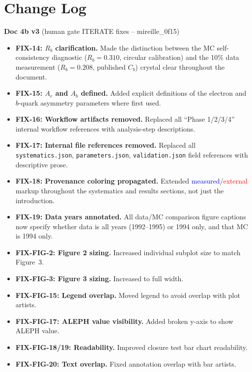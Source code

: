 \documentclass[11pt,a4paper]{article}
\newcommand{\measured}[1]{\textcolor{blue}{#1}}
\newcommand{\external}[1]{\textcolor{red}{#1}}
\begin{document}
\tableofcontents
\clearpage

\section*{Change Log}

\textbf{Doc 4b v3} (human gate ITERATE fixes -- mireille\_0f15)
\begin{itemize}
\item \textbf{FIX-14: $R_b$ clarification.} Made the distinction between the MC self-consistency
  diagnostic ($R_b = 0.310$, circular calibration) and the 10\% data measurement
  ($R_b = 0.208$, published $C_b$) crystal clear throughout the document.
\item \textbf{FIX-15: $A_e$ and $A_b$ defined.} Added explicit definitions of the
  electron and $b$-quark asymmetry parameters where first used.
\item \textbf{FIX-16: Workflow artifacts removed.} Replaced all ``Phase 1/2/3/4''
  internal workflow references with analysis-step descriptions.
\item \textbf{FIX-17: Internal file references removed.} Replaced all
  \texttt{systematics.json}, \texttt{parameters.json}, \texttt{validation.json}
  field references with descriptive prose.
\item \textbf{FIX-18: Provenance coloring propagated.} Extended
  \measured{measured}/\external{external} markup throughout the systematics and
  results sections, not just the introduction.
\item \textbf{FIX-19: Data years annotated.} All data/MC comparison figure captions
  now specify whether data is all years (1992--1995) or 1994 only, and that MC is
  1994 only.
\item \textbf{FIX-FIG-2: Figure 2 sizing.} Increased individual subplot size to match Figure~3.
\item \textbf{FIX-FIG-3: Figure 3 sizing.} Increased to full width.
\item \textbf{FIX-FIG-15: Legend overlap.} Moved legend to avoid overlap with plot artists.
\item \textbf{FIX-FIG-17: ALEPH value visibility.} Added broken y-axis to show ALEPH value.
\item \textbf{FIX-FIG-18/19: Readability.} Improved closure test bar chart readability.
\item \textbf{FIX-FIG-20: Text overlap.} Fixed annotation overlap with bar artists.

\end{itemize}
\end{document}
